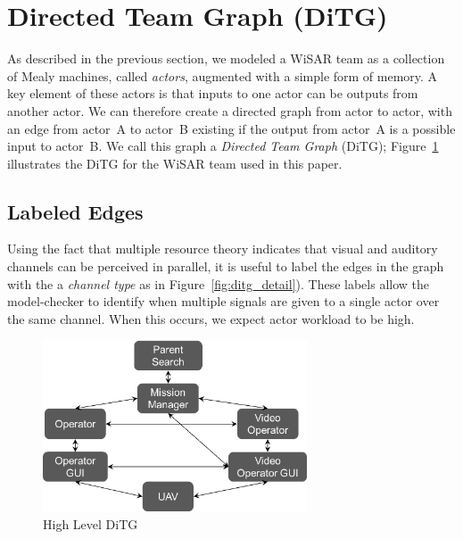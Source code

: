 \section{Directed Team Graph (DiTG)}

As described in the previous section, we modeled a WiSAR team as a collection of Mealy machines, called {\em actors}, augmented with a simple form of memory.  A key element of these actors is that inputs to one actor can be outputs from another actor.  We can therefore create a directed graph from actor to actor, with an edge from actor~A to actor~B existing if the output from actor~A is a possible input to actor~B.  We call this graph a {\em Directed Team Graph} (DiTG); Figure~\ref{fig:ditg} illustrates the DiTG for the WiSAR team used in this paper.   

\subsection{Labeled Edges}
Using the fact that multiple resource theory \cite{wickens2002multiple} indicates that visual and auditory channels can be perceived in parallel, it is useful to label the edges in the graph with the a {\em channel type} as in Figure~\ref{fig:ditg_detail}).  These labels allow the model-checker to identify when multiple signals are given to a single actor over the same channel.  When this occurs, we expect actor workload to be high.


\begin{figure}[hbt]
\center
\setlength{\abovecaptionskip}{1mm}
\setlength{\belowcaptionskip}{1mm}
\setlength{\textfloatsep}{1mm}
\setlength{\floatsep}{1mm}
\includegraphics[height=2in]{ditg.png}
\caption{High Level DiTG}
\label{fig:ditg}
\end{figure}


